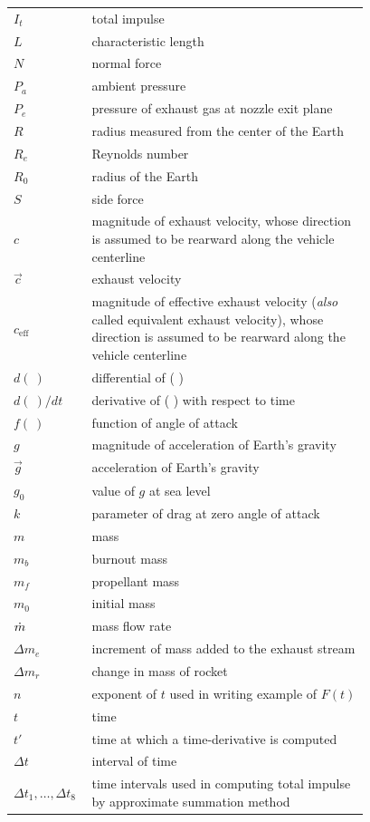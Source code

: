 \begin{longtable}{@{}l p{0.78\linewidth}@{}}
$I_t$ & total impulse \\
$L$ & characteristic length \\
$N$ & normal force \\
$P_a$ & ambient pressure \\
$P_e$ & pressure of exhaust gas at nozzle exit plane \\
$R$ & radius measured from the center of the Earth \\
$R_e$ & Reynolds number \\
$R_0$ & radius of the Earth \\
$S$ & side force \\
$c$ & magnitude of exhaust velocity, whose direction is assumed to be rearward along the vehicle centerline \\
$\vec{c}$ & exhaust velocity \\
$c_{\mathrm{eff}}$ & magnitude of effective exhaust velocity (\emph{also} called equivalent exhaust velocity), whose direction is assumed to be rearward along the vehicle centerline \\
$d(\ )$ & differential of ( ) \\
$d(\ )/dt$ & derivative of ( ) with respect to time \\
$f(\ )$ & function of angle of attack \\
$g$ & magnitude of acceleration of Earth's gravity \\
$\vec{g}$ & acceleration of Earth's gravity \\
$g_0$ & value of $g$ at sea level \\
$k$ & parameter of drag at zero angle of attack \\
$m$ & mass \\
$m_b$ & burnout mass \\
$m_f$ & propellant mass \\
$m_0$ & initial mass \\
$\dot{m}$ & mass flow rate \\
$\Delta m_e$ & increment of mass added to the exhaust stream \\
$\Delta m_r$ & change in mass of rocket \\
$n$ & exponent of $t$ used in writing example of $F(t)$ \\
$t$ & time \\
$t'$ & time at which a time-derivative is computed \\
$\Delta t$ & interval of time \\
$\Delta t_1, \ldots, \Delta t_8$ & time intervals used in computing total impulse by approximate summation method \\

\end{longtable}
